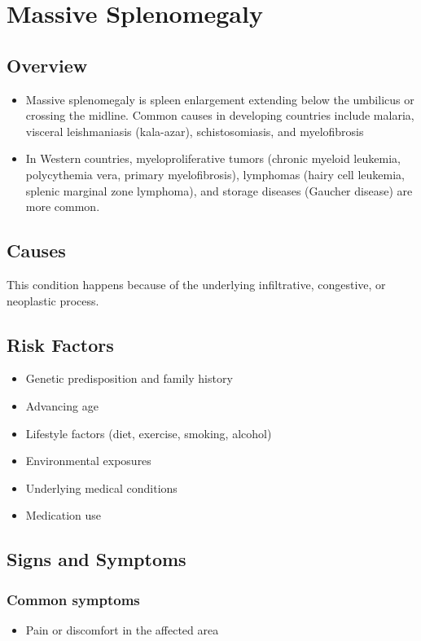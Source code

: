 \chapter{Massive Splenomegaly}
\label{sec:Massive Splenomegaly}

\section{Overview}


\begin{itemize}[noitemsep]
  \item Massive splenomegaly is spleen enlargement extending below the umbilicus or crossing the midline. Common causes in developing countries include malaria, visceral leishmaniasis (kala-azar), schistosomiasis, and myelofibrosis
  \item In Western countries, myeloproliferative tumors (chronic myeloid leukemia, polycythemia vera, primary myelofibrosis), lymphomas (hairy cell leukemia, splenic marginal zone lymphoma), and storage diseases (Gaucher disease) are more common.
\end{itemize}
\section{Causes}
This condition happens because of the underlying infiltrative, congestive, or neoplastic process.     
\section{Risk Factors}

\begin{itemize}[noitemsep]
  \item Genetic predisposition and family history
  \item Advancing age
  \item Lifestyle factors (diet, exercise, smoking, alcohol)
  \item Environmental exposures
  \item Underlying medical conditions
  \item Medication use
\end{itemize}
\section{Signs and Symptoms}

\subsection{Common symptoms}
\begin{itemize}[noitemsep]
  \item Pain or discomfort in the affected area
  \end{itemize}

